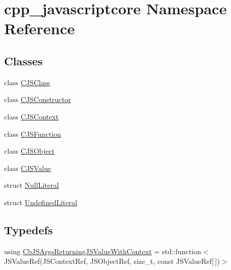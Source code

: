 \hypertarget{namespacecpp__javascriptcore}{}\section{cpp\+\_\+javascriptcore Namespace Reference}
\label{namespacecpp__javascriptcore}
\subsection*{Classes}
\begin{DoxyCompactItemize}
\item 
class \mbox{\hyperlink{classcpp__javascriptcore_1_1_c_j_s_class}{C\+J\+S\+Class}}
\item 
class \mbox{\hyperlink{classcpp__javascriptcore_1_1_c_j_s_constructor}{C\+J\+S\+Constructor}}
\item 
class \mbox{\hyperlink{classcpp__javascriptcore_1_1_c_j_s_context}{C\+J\+S\+Context}}
\item 
class \mbox{\hyperlink{classcpp__javascriptcore_1_1_c_j_s_function}{C\+J\+S\+Function}}
\item 
class \mbox{\hyperlink{classcpp__javascriptcore_1_1_c_j_s_object}{C\+J\+S\+Object}}
\item 
class \mbox{\hyperlink{classcpp__javascriptcore_1_1_c_j_s_value}{C\+J\+S\+Value}}
\item 
struct \mbox{\hyperlink{structcpp__javascriptcore_1_1_null_literal}{Null\+Literal}}
\item 
struct \mbox{\hyperlink{structcpp__javascriptcore_1_1_undefined_literal}{Undefined\+Literal}}
\end{DoxyCompactItemize}
\subsection*{Typedefs}
\begin{DoxyCompactItemize}
\item 
using \mbox{\hyperlink{namespacecpp__javascriptcore_ade392e059225cd35b14b1b7efb9d5a5b}{Cb\+J\+S\+Args\+Returning\+J\+S\+Value\+With\+Context}} = std\+::function$<$ J\+S\+Value\+Ref(J\+S\+Context\+Ref, J\+S\+Object\+Ref, size\+\_\+t, const J\+S\+Value\+Ref\mbox{[}$\,$\mbox{]})$>$
\end{DoxyCompactItemize}
